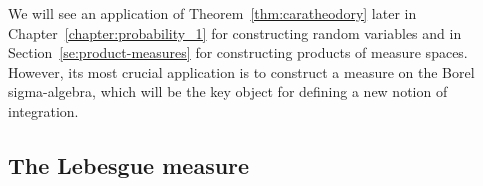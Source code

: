 %
%
%

We will see an application of Theorem~\ref{thm:caratheodory} later in Chapter~\ref{chapter:probability_1} for constructing random variables and in Section~\ref{se:product-measures} for constructing products of measure spaces. However, its most crucial application is to construct a measure on the Borel sigma-algebra, which will be the key object for defining a new notion of integration.


\subsection{The Lebesgue measure}

